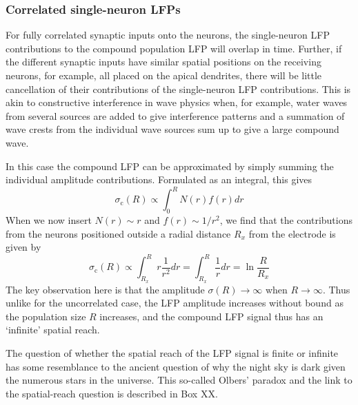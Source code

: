 \subsubsection{Correlated single-neuron LFPs}

For fully correlated synaptic inputs onto the neurons, the single-neuron LFP contributions to the compound population LFP will overlap in time.
Further, if the different synaptic inputs have similar spatial positions on the receiving neurons, for example, all placed on the apical dendrites,  there will be little cancellation of their contributions of the single-neuron LFP contributions. 
This is akin to constructive interference in wave physics when, for example, water waves from several sources are added to give interference patterns and a summation of wave crests from the individual wave sources sum up to give a large compound wave.

In this case the compound LFP can be 
approximated by simply summing the individual amplitude contributions. Formulated as an integral, this gives
\begin{equation}
\sigma_\text{c}(R) \propto \int_0^R N(r) f(r) dr 
\label{LFP:equation:sigmaR-correlated-integral}
\end{equation}
When we now insert $N(r) \sim r$ and $f(r) \sim 1/r^2$, we find that the contributions from the neurons
positioned outside a radial distance $R_x$ from the electrode is given by
\begin{equation}
\sigma_\text{c}(R) \propto \int_{R_x}^R r \frac{1}{r^2} dr =  \int_{R_x}^R \frac{1}{r} dr = \ln \frac{R}{R_x} 
\label{LFP:equation:sigmaR-correlated-integral-2}
\end{equation}
The key observation here is that the amplitude $\sigma (R) \rightarrow \infty$ when $R \rightarrow \infty$.
Thus unlike for the uncorrelated case, the LFP amplitude increases without bound as the population size $R$ increases, 
and the compound LFP signal thus has an `infinite' spatial reach.

The question of whether the spatial reach of the LFP signal is finite or infinite has some resemblance to  
the ancient question of why the night sky is dark given the numerous stars in the universe. This so-called
Olbers' paradox and the link to the spatial-reach question is described in Box XX.


